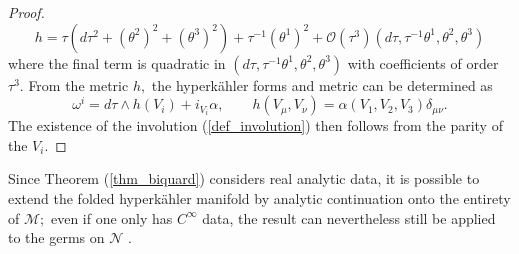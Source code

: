 \documentclass[a4paper,12pt, onecolumn, notitlepage]{article}
\theoremstyle{definition}
\theoremstyle{remark}
\newcommand{\al}{\alpha}
\newcommand{\w}{\omega}
\newcommand{\m}{\mu}
\newcommand{\n}{\nu}
\newcommand{\HK}{hyperk\"ahler }
\begin{document}
\begin{proof}
	\begin{equation*}
		h = \tau(d\tau^{2}+(\theta^{2})^{2} + (\theta^{3})^{2}) + \tau^{-1}(\theta^{1})^{2} + \mathcal{O}(\tau^{3})(d\tau,\tau^{-1}\theta^{1},\theta^{2},\theta^{3})
	\end{equation*}
	where the final term is quadratic in $(d\tau,\tau^{-1}\theta^{1},\theta^{2},\theta^{3})$ with coefficients of order $\tau^{3}.$ From the metric $h,$ the \HK forms and metric can be determined as
	\begin{equation*}
		\w^{i}=d\tau\wedge h(V_{i}) + i_{V_{i}}\al,\qquad h(V_{\m},V_{\n})=\al(V_{1},V_{2},V_{3})\delta_{\m\n}.
	\end{equation*}
	The existence of the involution (\ref{def_involution}) then follows from the parity of the $V_{i}.$
\end{proof}
Since Theorem (\ref{thm_biquard}) considers real analytic data, it is possible to extend the folded \HK manifold by analytic continuation onto the entirety of $\mathcal{M};$ even if one only has $C^{\infty}$ data, the result can nevertheless still be applied to the germs on $\mathcal{N}$ \cite{biquard_2015}.
\end{document}
